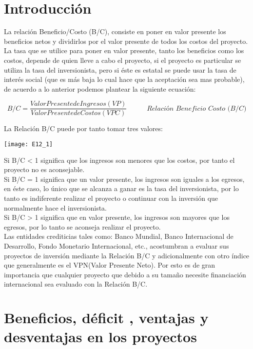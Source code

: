 \section{Introducción}
La relación Beneficio/Costo (B/C), consiste en poner en valor presente los beneficios netos y dividirlos por el valor presente de todos los costos del proyecto. La tasa que se utilice para poner en valor presente, tanto los beneficios como los costos, depende de quien lleve a cabo el proyecto, si el proyecto es particular se utiliza la tasa del inversionista, pero si éste es estatal se puede usar la tasa de interés social (que es más baja lo cual hace que la aceptación sea mas probable), de acuerdo a lo anterior podemos plantear la siguiente ecuación:

\begin{equation}
	B/C = \frac{Valor Presente de Ingresos(VP)}{Valor Presente de Costos(VPC)} \hspace{35pt} \textit{Relación Beneficio Costo (B/C)}
\end{equation}

La Relación B/C puede por tanto tomar tres valores:

\begin{center}
	\texttt{[image: E12\_1]}
\end{center}

Si B/C < 1 significa que los ingresos son menores que los costos, por tanto el proyecto no es aconsejable.
\\
Si B/C = 1 significa que un valor presente, los ingresos son iguales a los egresos, en éste caso, lo único que se alcanza a ganar es la tasa del inversionista, por lo tanto es indiferente realizar el proyecto o continuar con la inversión que normalmente hace el inversionista.
\\
Si B/C  > 1 significa que en valor presente, los ingresos son mayores que los egresos, por lo tanto se aconseja realizar el proyecto.
\\
Las entidades crediticias tales como: Banco Mundial, Banco Internacional de Desarrollo, Fondo Monetario Internacional, etc., acostumbran a evaluar sus proyectos de inversión mediante la Relación B/C y adicionalmente con otro índice que generalmente es el VPN(Valor Presente Neto). Por esto es de gran importancia que cualquier proyecto que debido a su tamaño necesite financiación internacional sea evaluado con la Relación B/C.

\section{Beneficios, déficit , ventajas y desventajas en los proyectos}

